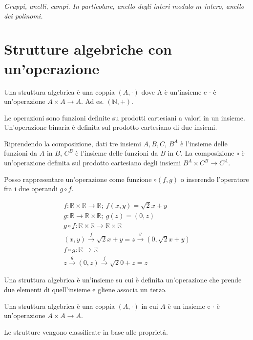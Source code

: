 \begin{center}
\indent
\textit{Gruppi, anelli, campi. In particolare, anello degli interi modulo $m$ intero, anello dei polinomi.}
\end{center}

\section{Strutture algebriche con un'operazione}

Una struttura algebrica \`e una coppia $(A, \cdot)$ dove A \`e un'insieme e $\cdot$ \`e un'operazione $A \times A \to A$. Ad es. $(\mathbb{N}, +)$.

Le operazioni sono funzioni definite su prodotti cartesiani a valori in un insieme. Un'operazione binaria \`e definita sul prodotto cartesiano di due insiemi.

Riprendendo la composizione, dati tre insiemi $A, B, C$, $B^A$ \`e l'insieme delle funzioni da $A$ in $B$, $C^B$ \`e l'insieme delle funzioni da $B$ in $C$. La composizione $\circ$ \`e un'operazione definita sul prodotto cartesiano degli insiemi $B^A \times C^B \to C^A$.

Posso rappresentare un'operazione come funzione $\circ \left( f, g \right)$ o inserendo l'operatore fra i due operandi $ g \circ f $.

\begin{gather*}
f: \mathbb{R} \times \mathbb{R} \to \mathbb{R} ; \
f(x,y) = \sqrt{2}x + y \\
g: \mathbb{R} \to \mathbb{R} \times \mathbb{R} ; \
g(z) = (0,z) \\
g \circ f : \mathbb{R} \times \mathbb{R} \to \mathbb{R} \times \mathbb{R} \\
(x,y) \xrightarrow{f} \sqrt{2}x + y = z \xrightarrow{g} \left( 0, \sqrt{2}x + y \right) \\
f \circ g : \mathbb{R} \to \mathbb{R} \\
z \xrightarrow{g} (0,z) \xrightarrow{f} \sqrt{2} 0 + z = z
\end{gather*}

Una struttura algebrica \`e un'insieme su cui \`e definita un'operazione che prende due elementi di quell'insieme e gliene associa un terzo.

Una struttura algebrica \`e una coppia $\left(A, \cdot \right)$ in cui $A$ \`e un insieme e $\cdot$ \`e un'operazione $A \times A \to A$.

Le strutture vengono classificate in base alle propriet\`a.

